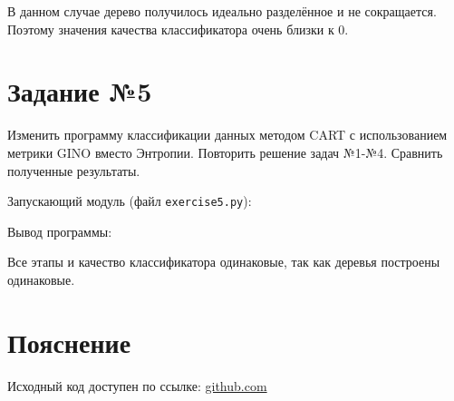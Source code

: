 \documentclass{article} %
\begin{document}
В данном случае дерево получилось идеально разделённое
и не сокращается.
Поэтому значения качества классификатора очень близки к 0.

\clearpage
\section{Задание №5}
Изменить программу классификации данных методом CART
с использованием метрики GINO вместо Энтропии.
Повторить решение задач №1-№4.
Сравнить полученные результаты.
\bigskip

Запускающий модуль (файл \verb$exercise5.py$):
\bigskip

Вывод программы:


Все этапы и качество классификатора одинаковые,
так как деревья построены одинаковые.

\section{Пояснение}
Исходный код доступен по ссылке:
\href{https://github.com/SvichkarevAnatoly/Course-Python-Bioinformatics/tree/master/semester2/task5}
{github.com}
\end{document}
